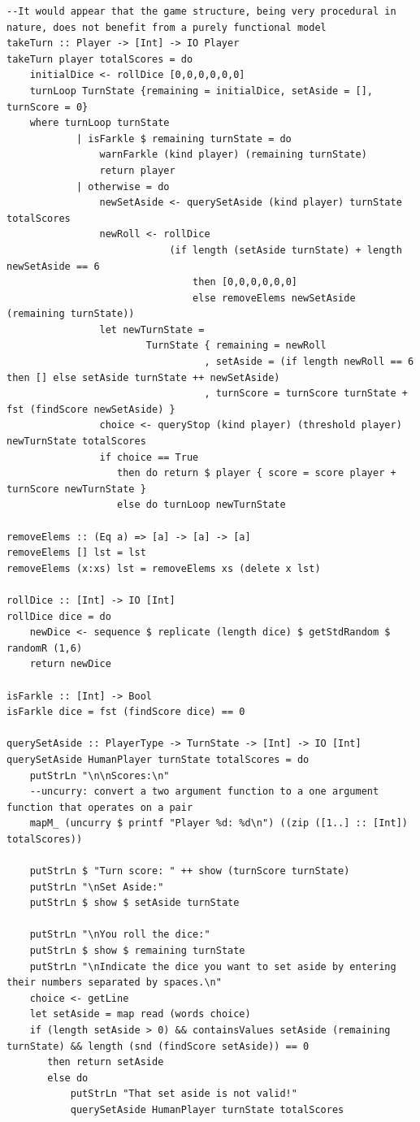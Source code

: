 \documentclass{article}
\begin{document}
\begin{verbatim}
--It would appear that the game structure, being very procedural in nature, does not benefit from a purely functional model
takeTurn :: Player -> [Int] -> IO Player
takeTurn player totalScores = do
    initialDice <- rollDice [0,0,0,0,0,0]
    turnLoop TurnState {remaining = initialDice, setAside = [], turnScore = 0} 
    where turnLoop turnState
            | isFarkle $ remaining turnState = do
                warnFarkle (kind player) (remaining turnState)
                return player
            | otherwise = do
                newSetAside <- querySetAside (kind player) turnState totalScores
                newRoll <- rollDice
                            (if length (setAside turnState) + length newSetAside == 6
                                then [0,0,0,0,0,0]
                                else removeElems newSetAside (remaining turnState))
                let newTurnState =
                        TurnState { remaining = newRoll
                                  , setAside = (if length newRoll == 6 then [] else setAside turnState ++ newSetAside)
                                  , turnScore = turnScore turnState + fst (findScore newSetAside) }
                choice <- queryStop (kind player) (threshold player) newTurnState totalScores
                if choice == True
                   then do return $ player { score = score player + turnScore newTurnState }
                   else do turnLoop newTurnState

removeElems :: (Eq a) => [a] -> [a] -> [a]
removeElems [] lst = lst
removeElems (x:xs) lst = removeElems xs (delete x lst)

rollDice :: [Int] -> IO [Int]
rollDice dice = do
    newDice <- sequence $ replicate (length dice) $ getStdRandom $ randomR (1,6)
    return newDice

isFarkle :: [Int] -> Bool
isFarkle dice = fst (findScore dice) == 0

querySetAside :: PlayerType -> TurnState -> [Int] -> IO [Int]
querySetAside HumanPlayer turnState totalScores = do
    putStrLn "\n\nScores:\n"
    --uncurry: convert a two argument function to a one argument function that operates on a pair
    mapM_ (uncurry $ printf "Player %d: %d\n") ((zip ([1..] :: [Int]) totalScores))

    putStrLn $ "Turn score: " ++ show (turnScore turnState)
    putStrLn "\nSet Aside:"
    putStrLn $ show $ setAside turnState

    putStrLn "\nYou roll the dice:"
    putStrLn $ show $ remaining turnState
    putStrLn "\nIndicate the dice you want to set aside by entering their numbers separated by spaces.\n"
    choice <- getLine
    let setAside = map read (words choice)
    if (length setAside > 0) && containsValues setAside (remaining turnState) && length (snd (findScore setAside)) == 0
       then return setAside
       else do
           putStrLn "That set aside is not valid!"
           querySetAside HumanPlayer turnState totalScores


\end{verbatim}
\end{document}
